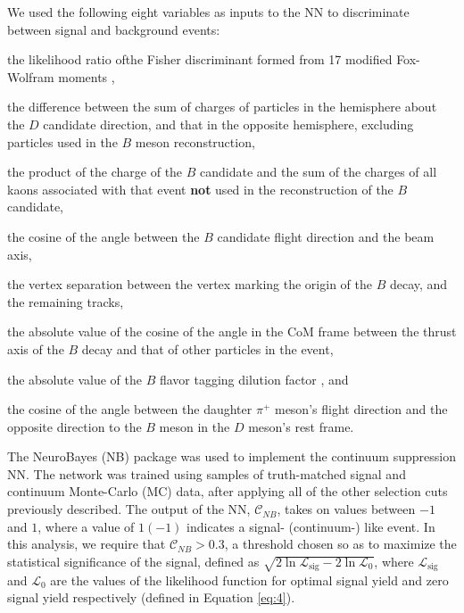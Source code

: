 \documentclass[aps,prl,twocolumn,superscriptaddress,showpacs,preprintnumbers,amsmath,amssymb]{revtex4}
\begin{document}
We used the following eight variables as inputs to the NN to discriminate between signal and background events: 
\begin {enumerate*} [label=\itshape\arabic*\upshape)]
\item the likelihood ratio ofthe Fisher discriminant formed from 17 modified Fox-Wolfram moments \cite{Wolfram}, \item the difference between the sum of charges of particles in the hemisphere about the $D$ candidate direction, and that in the opposite hemisphere, excluding particles used in the $B$ meson reconstruction, \item the product of the charge of the $B$ candidate and the sum of the charges of all kaons associated with that event \textbf{not} used in the reconstruction of the $B$ candidate, \item the cosine of the angle between the $B$ candidate flight direction and the beam axis, \item the vertex separation between the vertex marking the origin of the $B$ decay, and the remaining tracks, \item the absolute value of the cosine of the angle in the CoM frame between the thrust axis of the $B$ decay and that of other particles in the event, \item the absolute value of the $B$ flavor tagging dilution factor \cite{Bdilution}, and \item the cosine of the angle between the daughter $\pi^+$ meson's flight direction and the opposite direction to the $B$ meson in the $D$ meson's rest frame.
\end {enumerate*}

The NeuroBayes (NB) package \cite{Feindt} was used to implement the continuum suppression NN. The network was trained using samples of truth-matched signal and continuum Monte-Carlo (MC) data, after applying all of the other selection cuts previously described. The output of the NN, $\mathcal{C}_{NB}$, takes on values between $-1$ and $1$, where a value of $1 (-1)$ indicates a signal- (continuum-) like event. In this analysis, we require that $\mathcal{C}_{NB} > 0.3$, a threshold chosen so as to maximize the statistical significance of the signal, defined as $\sqrt{2 \ln \mathcal{L}_{\mathrm{sig}} - 2 \ln \mathcal{L}_{\mathrm{0}}}$, where $\mathcal{L}_{\mathrm{sig}}$ and $\mathcal{L}_{\mathrm{0}}$ are the values of the likelihood function for optimal signal yield and zero signal yield respectively (defined in Equation \ref{eq:4}). 
\end{document}
